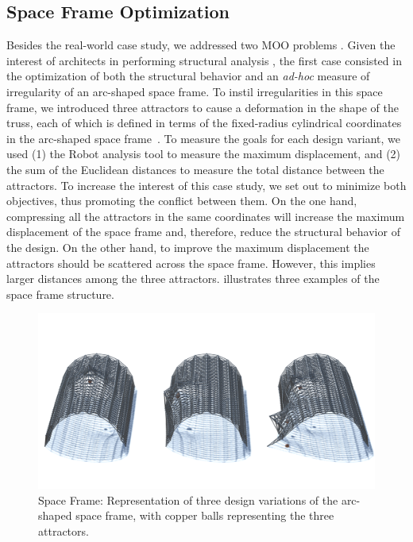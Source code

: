 \subsection{Space Frame Optimization}

Besides the real-world case study, we addressed two \ac{MOO} problems \cite{Belem2019MOO,IP2019MOO}. Given the interest of architects in performing structural analysis \cite{Cichocka2017SURVEY}, the first case consisted in the optimization of both the structural behavior and an \textit{ad-hoc} measure of irregularity of an arc-shaped space frame. To instil irregularities in this space frame, we introduced three attractors to cause a deformation in the shape of the truss, each of which is defined in terms of the fixed-radius cylindrical coordinates in the arc-shaped space frame~\cite{Belem2019MOO}. To measure the goals for each design variant, we used (1) the Robot analysis tool to measure the maximum displacement, and (2) the sum of the Euclidean distances to measure the total distance between the attractors. To increase the interest of this case study, we set out to minimize both objectives, thus promoting the conflict between them. On the one hand, compressing all the attractors in the same coordinates will increase the maximum displacement of the space frame and, therefore, reduce the structural behavior of the design. On the other hand,  to improve the maximum displacement the attractors should be scattered across the space frame. However, this implies larger distances among the three attractors.  illustrates three examples of the space frame structure. 

\begin{figure}[htbp]
	\centering
	\includegraphics[width=1\textwidth]{Images/Evaluation/truss-kat.png}
	\caption[Space Frame: Representation of three space frame design variants]{Space Frame: Representation of three design variations of the arc-shaped space frame, with copper balls representing the three attractors.}
	\label{fig:spaceframe}
\end{figure}

